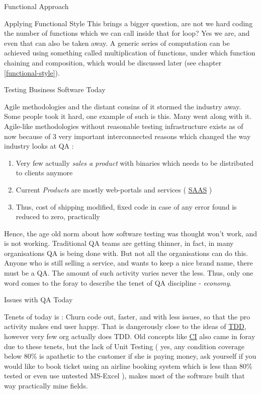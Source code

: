 \begin{section}{Functional Approach}
\begin{subsection}{Applying Functional Style}
This brings a bigger question, are not we hard coding the number of functions which we can call inside that for loop? Yes we are, and even that can also be taken away.  A generic series of computation can be achieved using something called multiplication of functions, under which function chaining and composition, which would be discussed later (see chapter \ref{functional-style}). 

\end{subsection}
\end{section}

\begin{section}{Testing Business Software Today}\label{practical-testing}

Agile methodologies and the distant cousins of it stormed the industry away. Some people took it hard, one example of such is this. Many went along with it. Agile-like methodologies without reasonable testing infrastructure exists as of now because of 3 very important interconnected reasons which changed the way industry looks at QA :

\begin{enumerate}
\item{ Very few actually \emph{sales a product} with binaries which needs to be distributed to clients anymore}
\item{ Current \emph{Products} are mostly web-portals and services ( \href{https://en.wikipedia.org/wiki/Software_as_a_service}{SAAS} ) } 
\item{Thus, cost of shipping modified, fixed code in case of any error found is reduced to zero, practically}
\end{enumerate}


Hence, the age old norm about how software testing was thought won't work, and is not working. Traditional QA teams are getting thinner, in fact, in many organisations QA is being done with. But not all the organisations can do this. Anyone who is still selling a service, and wants to keep a nice brand name,  there must be a QA. The amount of such activity  varies never the less. Thus, only one word comes to the foray to describe the tenet of QA discipline  - \emph{economy}.

\begin{subsection}{Issues with QA Today}

Tenets of today is : Churn code out, faster, and with less issues, so that the pro activity makes end user happy. That is dangerously close to the ideas of \href{https://en.wikipedia.org/wiki/Test-driven_development}{TDD}, however very few org actually does TDD. Old concepts like \href{https://en.wikipedia.org/wiki/Continuous_integration}{CI}  also came in foray due to these tenets, but the lack of Unit Testing ( yes, any condition coverage below 80\% is apathetic to the customer if she is paying money, ask yourself if you would like to book ticket using an airline booking system which is less than 80\% tested or even use untested MS-Excel ), makes most of the software built that way practically mine fields.


\end{subsection}
\end{section}
